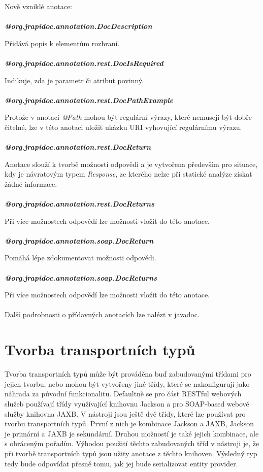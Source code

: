 \documentclass[11pt,twoside,a4paper]{book}
\begin{document}
Nově vzniklé anotace:
\mbox{}\\
\mbox{}\\
\textbf{\textit{@org.jrapidoc.annotation.DocDescription}}

Přidává popis k elementům rozhraní.
\mbox{}\\
\mbox{}\\
\textbf{\textit{@org.jrapidoc.annotation.rest.DocIsRequired}}

Indikuje, zda je parametr či atribut povinný.
\mbox{}\\
\mbox{}\\
\textbf{\textit{@org.jrapidoc.annotation.rest.DocPathExample}}

Protože v anotaci {\em @Path} mohou být regulární výrazy, které nemusejí být dobře čitelné, lze v
této anotaci uložit ukázku URI vyhovující regulárnímu výrazu.
\mbox{}\\
\mbox{}\\
\textbf{\textit{@org.jrapidoc.annotation.rest.DocReturn}}

Anotace slouží k tvorbě možnosti odpovědi a je vytvořena především pro situace, kdy je
návratovým typem {\em Response}, ze kterého nelze při statické analýze získat žádné informace.
\mbox{}\\
\mbox{}\\
\textbf{\textit{@org.jrapidoc.annotation.rest.DocReturns}}

Při více možnostech odpovědí lze možnosti vložit do této anotace.
\mbox{}\\
\mbox{}\\
\textbf{\textit{@org.jrapidoc.annotation.soap.DocReturn}}

Pomáhá lépe zdokumentovat možnosti odpovědi.
\mbox{}\\
\mbox{}\\
\textbf{\textit{@org.jrapidoc.annotation.soap.DocReturns}}

Při více možnostech odpovědí lze možnosti vložit do této anotace.
\mbox{}\\
\mbox{}\\
Další podrobnosti o přídavných anotacích lze nalézt v javadoc.

\section{Tvorba transportních typů}

Tvorba transportních typů může být prováděna buď zabudovanými třídami pro jejich
tvorbu, nebo mohou být vytvořeny jiné třídy, které se nakonfigurují jako náhrada
za původní funkcionalitu. Defaultně se pro část RESTful webových služeb
používají třídy využívající knihovnu Jackson a pro SOAP-based webové služby
knihovna JAXB. V nástroji jsou ještě dvě třídy, které lze používat pro tvorbu
transportních typů. První z nich je kombinace Jackson a JAXB, Jackson je
primární a JAXB je sekundární. Druhou možností je také jejich kombinace, ale s
obráceným pořadím. Výhodou použití těchto zabudovaných tříd v nástroji je, že
při tvorbě transportních typů jsou užity anotace z těchto knihoven. Výsledný typ
tedy bude odpovídat přesně tomu, jak jej bude serializovat entity provider. 
\end{document}
